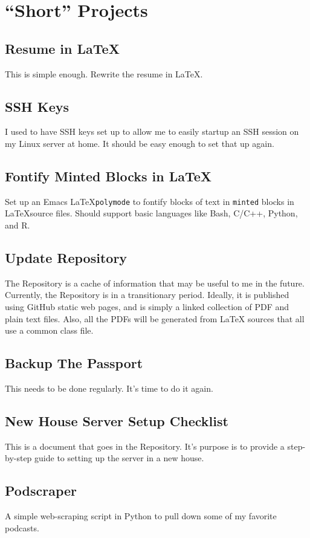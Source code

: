 \documentclass{designdoc}
\begin{document}
\section*{``Short'' Projects}
\subsection*{Resume in \LaTeX}
This is simple enough. Rewrite the resume in \LaTeX.

\subsection*{SSH Keys}
I used to have SSH keys set up to allow me to easily startup an SSH session on
my Linux server at home. It should be easy enough to set that up again.

\subsection*{Fontify Minted Blocks in \LaTeX}
Set up an Emacs \LaTeX \texttt{polymode} to fontify blocks of text in
\texttt{minted} blocks in \LaTeX source files. Should support basic languages
like Bash, C/C++, Python, and R.

\subsection*{Update Repository}
The Repository is a cache of information that may be useful to me in the
future. Currently, the Repository is in a transitionary period. Ideally, it is
published using GitHub static web pages, and is simply a linked collection of
PDF and plain text files. Also, all the PDFs will be generated from \LaTeX
sources that all use a common class file.

\subsection*{Backup The Passport}
This needs to be done regularly. It's time to do it again.

\subsection*{New House Server Setup Checklist}
This is a document that goes in the Repository. It's purpose is to provide a
step-by-step guide to setting up the server in a new house.

\subsection*{Podscraper}
A simple web-scraping script in Python to pull down some of my favorite
podcasts.
\end{document}
